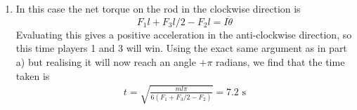 \begin{problem}
{\begin{enumerate}
\begin{equation*}
\theta=\omega_0t+\frac{1}{2}\ddot\theta t^2
\end{equation*}
Since the initial angular speed $\omega_0$ is zero, we can calculate $t$ directly:
\begin{align*}
\theta&=\frac{1}{2}\cdot\frac{12(F_1-F_2)}{ml}t^2 \\
\Rightarrow t^2&=\frac{ml\theta}{6(F_1-F_2)}
\end{align*}
Since $F_2>F_1$,  player 2 will win and we want the time it takes to reach $\theta=-\pi$ radians, so the final answer becomes
\begin{equation*}
t=\sqrt{\frac{-ml\pi}{6(F_1-F_2)}}=5.1\textrm{ s}
\end{equation*}
\item In this case the net torque on the rod in the clockwise direction is 
\begin{equation*}
F_1l+F_3l/2-F_2l=I\ddot\theta
\end{equation*}
Evaluating this gives a positive acceleration in the anti-clockwise direction, so this time players 1 and 3 will win. Using the exact same argument as in part a) but realising it will now reach an angle $+\pi$ radians, we find that the time taken is 
\begin{align*}
t=\sqrt{\frac{ml\pi}{6(F_1+F_3/2-F_2)}}=7.2\textrm{ s}
\end{align*}
\end{enumerate}
}
\end{problem}